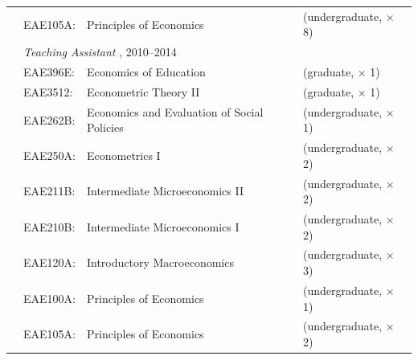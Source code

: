 \begin{tabular}{llll}
	& EAE105A:
	& Principles of Economics
	& (undergraduate, $\times$ 8)
	\\[1em]
	
	
	&
	\multicolumn{3}{l}{
		\textit{%
			Teaching Assistant%
		}%
		,
		2010--2014
	}
	\\[.5ex]
	
	& EAE396E:
	& Economics of Education
	& (graduate, $\times$ 1)
	\\%
	
	& EAE3512:
	& Econometric Theory II
	& (graduate, $\times$ 1)
	\\%
	
	& EAE262B:
	& Economics and Evaluation of Social Policies%
	& (undergraduate, $\times$ 1)
%	
	\\%
	
	& EAE250A:
	& Econometrics I
	& (undergraduate, $\times$ 2)
	\\%
	
	& EAE211B:
	& Intermediate Microeconomics II
	& (undergraduate, $\times$ 2)
	\\%
	
	& EAE210B:
	& Intermediate Microeconomics I
	& (undergraduate, $\times$ 2)
	\\%
	
	& EAE120A:
	& Introductory Macroeconomics
	& (undergraduate, $\times$ 3)
	\\%
	
	& EAE100A:
	& Principles of Economics
	& (undergraduate, $\times$ 1)
	\\%
	
	& EAE105A:
	& Principles of Economics
	& (undergraduate, $\times$ 2)
	\\%
	
\end{tabular}